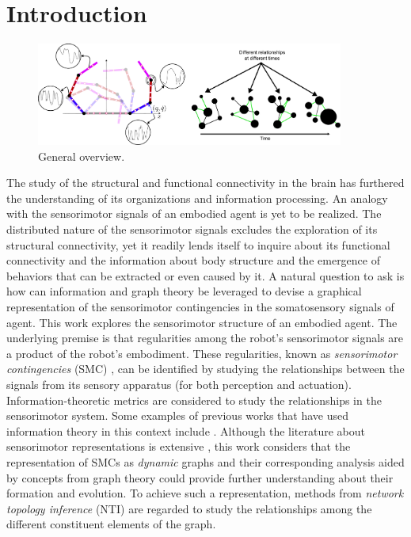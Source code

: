 \section{Introduction}\label{sec:intro}
\begin{figure}[!ht]
	\centering
	\includegraphics[width=0.9\textwidth]{dfc_concept_art.pdf}
	\caption{General overview.}
	\label{fig:general_overview}
\end{figure}
The study of the structural and functional connectivity in the brain has furthered the understanding of its organizations and information processing. An analogy with the sensorimotor signals of an embodied agent is yet to be realized. The distributed nature of the sensorimotor signals excludes the exploration of its structural connectivity, yet it readily lends itself to inquire about its functional connectivity and the information about body structure and the emergence of behaviors that can be extracted or even caused by it. 
A natural question to ask is how can information and graph theory be leveraged to devise a graphical representation of the sensorimotor contingencies in the somatosensory signals of agent. This work explores the sensorimotor structure of an embodied agent. The underlying premise is that regularities among the robot's sensorimotor signals are a product of the robot’s embodiment. These regularities, known as \emph{sensorimotor contingencies} (SMC) \cite{Jacquey2019Sensorimotorcontingenciesas}, can be identified by studying the relationships between the signals from its sensory apparatus (for both perception and actuation). Information-theoretic metrics are considered to study the relationships in the sensorimotor system. Some examples of previous works that have used information theory in this context include  \cite{Schmidt2013Bootstrappingperceptionusing,Lungarella2006Mappinginformationflow,Polani2009Modelsinformationprocessing,Bossomaier2016introductiontransferentropy,Olsson2006unknownsensorsactuators}. Although the literature about sensorimotor representations is extensive \cite{Nguyen2021Sensorimotorrepresentationlearning}, this work considers that the representation of SMCs as \emph{dynamic} graphs and their corresponding analysis aided by concepts from graph theory could provide further understanding about their formation and evolution. To achieve such a representation, methods from \emph{network topology inference} (NTI)\cite{Dong2019Learninggraphsdata} are regarded to study the relationships among the different constituent elements of the graph.

